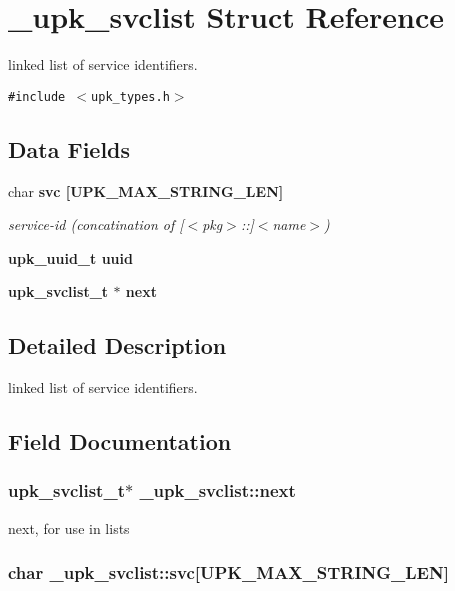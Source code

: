 \section{\_\-upk\_\-svclist Struct Reference}
\label{struct__upk__svclist}
linked list of service identifiers.  


{\tt \#include $<$upk\_\-types.h$>$}

\subsection*{Data Fields}
\begin{CompactItemize}
\item 
char \bf{svc} [UPK\_\-MAX\_\-STRING\_\-LEN]
\begin{CompactList}\small\item\em service-id (concatination of [$<$pkg$>$::]$<$name$>$) \item\end{CompactList}\item 
\bf{upk\_\-uuid\_\-t} \bf{uuid}
\item 
\bf{upk\_\-svclist\_\-t} $\ast$ \bf{next}
\end{CompactItemize}


\subsection{Detailed Description}
linked list of service identifiers. 



\subsection{Field Documentation}
\subsubsection{\setlength{\rightskip}{0pt plus 5cm}\bf{upk\_\-svclist\_\-t}$\ast$ \bf{\_\-upk\_\-svclist::next}}\label{struct__upk__svclist_1b2a260a3e8f9786439be131e0337bad}


next, for use in lists 
\subsubsection{\setlength{\rightskip}{0pt plus 5cm}char \bf{\_\-upk\_\-svclist::svc}[UPK\_\-MAX\_\-STRING\_\-LEN]}\label{struct__upk__svclist_61a2b6dc438865944cbe46c0cbcf5f60}


